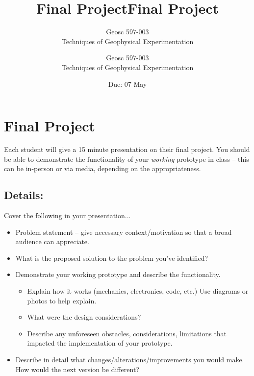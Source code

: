 \documentclass[10pt]{article}
\title{Final Project} %
\author{Geosc 597-003 \\
		Techniques of Geophysical Experimentation} %
\date{Due: #1}
\newcommand{\titler}[1]{
	\title{Final Project} %
	\author{Geosc 597-003 \\
		Techniques of Geophysical Experimentation} %
	\date{Due: #1}
	
	\maketitle}
\begin{document}

\titler{07 May}

\section*{Final Project}
Each student will give a 15 minute presentation on their final project. You should be able to demonstrate the functionality of your \textit{working} prototype in class -- this can be in-person or via media, depending on the appropriateness. 

\subsection*{Details:}
Cover the following in your presentation...
\begin{itemize}
	\item Problem statement -- give necessary context/motivation so that a broad audience can appreciate.
	\item What is the proposed solution to the problem you've identified?
	\item Demonstrate your working prototype and describe the functionality.
	\begin{itemize}
		\item Explain how it works (mechanics, electronics, code, etc.) Use diagrams or photos to help explain.
		\item What were the design considerations?
		\item Describe any unforeseen obstacles, considerations, limitations that impacted the implementation of your prototype.
	\end{itemize}
	\item Describe in detail what changes/alterations/improvements you would make. How would the next version be different?
\end{itemize}
\end{document}
